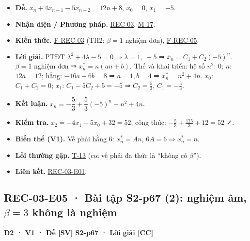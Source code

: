 \documentclass[
  10pt,
  twoside,openany]{book}
\providecommand{\tightlist}{%
  \setlength{\itemsep}{0pt}\setlength{\parskip}{0pt}}
\begin{document}
\begin{itemize}
\tightlist
\item
  \textbf{Đề.} \(x_n+4x_{n-1}-5x_{n-2}=12n+8\), \(x_0=0\), \(x_1=-5\).
\item
  \textbf{Nhận diện / Phương pháp.} \protect\hyperlink{REC-03}{REC-03},
  \protect\hyperlink{M-17}{M-17}.
\item
  \textbf{Kiến thức.} \protect\hyperlink{F-REC-03}{F-REC-03} (TH2:
  \(\beta=1\) nghiệm đơn), \protect\hyperlink{F-REC-05}{F-REC-05}.
\item
  \textbf{Lời giải.} PTĐT
  \(\lambda^2+4\lambda-5=0\Rightarrow\lambda=1,\ -5\) ⇒
  \(\bar x_n=C_1+C_2(-5)^n\). \(\beta=1\) nghiệm đơn ⇒
  \(x_n^*=n(an+b)\). Thế và khai triển: hệ số \(n^2\): \(0\); \(n\):
  \(12a=12\); hằng: \(-16a+6b=8\) ⇒ \(a=1,b=4\) ⇒ \(x_n^*=n^2+4n\).
  \(x_0\): \(C_1+C_2=0\); \(x_1\): \(C_1-5C_2+5=-5\) ⇒ \(C_2=\frac53\),
  \(C_1=-\frac53\).
\item
  \textbf{Kết luận.} \(x_n=-\dfrac53+\dfrac53(-5)^n+n^2+4n\).
\item
  \textbf{Kiểm tra.} \(x_2=-4x_1+5x_0+32=52\); công thức:
  \(-\frac53+\frac{125}{3}+12=52\) ✓.
\item
  \textbf{Biến thể (V1).} Vế phải hằng 6: \(x_n^*=An\),
  \(6A=6\Rightarrow x_n^*=n\).
\item
  \textbf{Lỗi thường gặp.} \protect\hyperlink{T-13}{T-13} (coi vế phải
  đa thức là ``không có \(\beta\)'').
\item
  \textbf{Liên kết.} \protect\hyperlink{REC-03-E01}{REC-03-E01}.
\end{itemize}

\hypertarget{REC-03-E05}{%
\subsection{\texorpdfstring{REC-03-E05 · Bài tập S2-p67 (2): nghiệm âm,
\(\beta=3\) không là
nghiệm}{REC-03-E05 · Bài tập S2-p67 (2): nghiệm âm, \textbackslash beta=3 không là nghiệm}}\label{REC-03-E05}}

\textbf{D2 · V1 · Đề {[}SV{]} S2-p67 · Lời giải {[}CC{]}}
\end{document}
